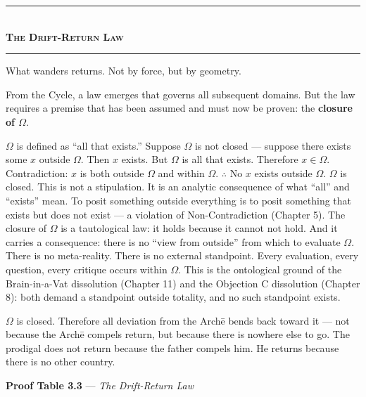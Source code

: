 \documentclass[10pt, openany, oneside]{book}
\renewcommand{\normalsize}{\fontsize{10}{13}\selectfont}
\begin{document}

\begin{center}
    \rule{0.3\textwidth}{0.4pt}\\[0.5em]
    {\normalsize\bfseries\scshape The Drift-Return Law}\\[0.3em]
    \rule{0.3\textwidth}{0.4pt}
\end{center}

\vspace{1em}

\noindent What wanders returns. Not by force, but by geometry.

From the Cycle, a law emerges that governs all subsequent domains. But the law requires a premise that has been assumed and must now be proven: the \textbf{closure of $\Omega$}.

$\Omega$ is defined as ``all that exists.'' Suppose $\Omega$ is not closed --- suppose there exists some $x$ outside $\Omega$. Then $x$ exists. But $\Omega$ is all that exists. Therefore $x \in \Omega$. Contradiction: $x$ is both outside $\Omega$ and within $\Omega$. $\therefore$ No $x$ exists outside $\Omega$. $\Omega$ is closed. This is not a stipulation. It is an analytic consequence of what ``all'' and ``exists'' mean. To posit something outside everything is to posit something that exists but does not exist --- a violation of Non-Contradiction (Chapter 5). The closure of $\Omega$ is a tautological law: it holds because it cannot not hold. And it carries a consequence: there is no ``view from outside'' from which to evaluate $\Omega$. There is no meta-reality. There is no external standpoint. Every evaluation, every question, every critique occurs within $\Omega$. This is the ontological ground of the Brain-in-a-Vat dissolution (Chapter 11) and the Objection C dissolution (Chapter 8): both demand a standpoint outside totality, and no such standpoint exists.

$\Omega$ is closed. Therefore all deviation from the Arch\={e} bends back toward it --- not because the Arch\={e} compels return, but because there is nowhere else to go. The prodigal does not return because the father compels him. He returns because there is no other country.

\vspace{0.5em}

\textbf{Proof Table 3.3} --- \textit{The Drift-Return Law}

\vspace{0.5em}
\end{document}
